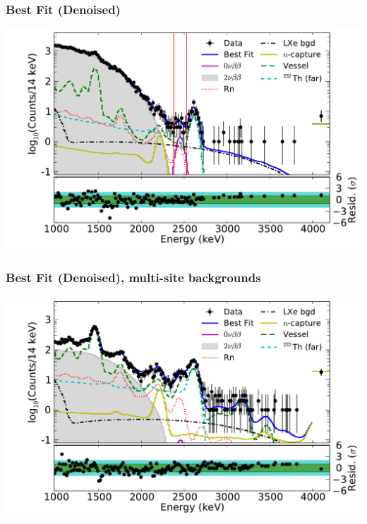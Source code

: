 \documentclass{beamer}
\begin{document}
\begin{frame}
\begin{center}
\frametitle{Best Fit (Denoised)}
\end{center}
\vspace{0.6cm}
\begin{center}
\includegraphics[keepaspectratio=true,width=\textwidth,clip=true,trim=14mm 0mm 0mm 0mm]{Energy_BestFit_ss.pdf}
\end{center}
\end{frame}

\begin{frame}
\begin{center}
\frametitle{Best Fit (Denoised), multi-site backgrounds}
\end{center}
\vspace{0.6cm}
\begin{center}
\includegraphics[keepaspectratio=true,width=\textwidth,clip=true,trim=14mm 0mm 0mm 0mm]{Energy_BestFit_ms.pdf}
\end{center}
\end{frame}
\end{document}
